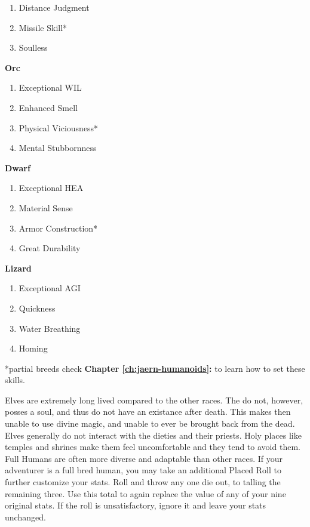 \begin{multicols*}{2}
\begin{multicols}{2}
\begin{tcolorbox}[breakable,boxrule=0pt,after skip=0pt]
\begin{enumerate}[leftmargin=0.1cm]
\item Distance Judgment
\item Missile Skill*
\item Soulless
\end{enumerate}
\end{tcolorbox}
\begin{tcolorbox}[breakable,boxrule=0pt,after skip=0pt]
\textbf{Orc}
\begin{enumerate}[leftmargin=0.1cm]
\item Exceptional WIL
\item Enhanced Smell
\item Physical Viciousness*
\item Mental Stubbornness
\end{enumerate}
\end{tcolorbox}
\begin{tcolorbox}[breakable,boxrule=0pt,after skip=0pt]
\textbf{Dwarf}
\begin{enumerate}[leftmargin=0.1cm]
\item Exceptional HEA
\item Material Sense
\item Armor Construction*
\item Great Durability
\end{enumerate}
\end{tcolorbox}
\begin{tcolorbox}[breakable,boxrule=0pt,after skip=0pt]
\textbf{Lizard}
\begin{enumerate}[leftmargin=0.1cm]
\item Exceptional AGI
\item Quickness
\item Water Breathing
\item Homing
\end{enumerate}
\end{tcolorbox}
\end{multicols}

*partial breeds check \textbf{Chapter \ref{ch:jaern-humanoids}: } to learn how to set these skills.

Elves are extremely long lived compared to the other races. The do not, however, posses a soul, and thus do not have an existance after death. This makes then unable to use divine magic, and unable to ever be brought back from the dead. Elves generally do not interact with the dieties and their priests. Holy places like temples and shrines make them feel uncomfortable and they tend to avoid them.\\
Full Humans are often more diverse and adaptable than other races. If your adventurer is a full bred human, you may take an additional Placed Roll to further customize your stats. Roll  and throw any one die out, to talling the remaining three. Use this total to again replace the value of any of your nine original stats. If the roll is unsatisfactory, ignore it and leave your stats unchanged.

\end{multicols*}
